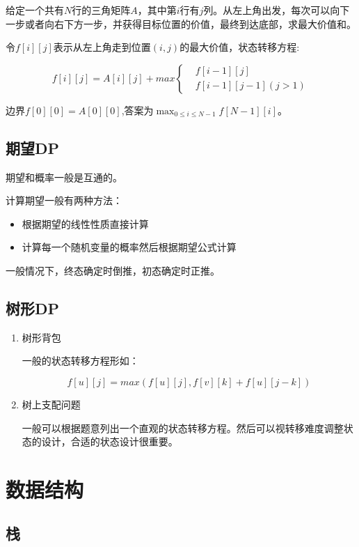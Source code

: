 \documentclass[11pt]{article}
\begin{document}
给定一个共有\(N\)行的三角矩阵\(A\)，其中第\(i\)行有\(j\)列。从左上角出发，每次可以向下一步或者向右下方一步，并获得目标位置的价值，最终到达底部，求最大价值和。

令\(f[i][j]\)表示从左上角走到位置\((i,j)\)的最大价值，状态转移方程:

\[
f[i][j]=A[i][j]+max\left\{\begin{aligned}
&f[i-1][j]\\
&f[i-1][j-1] (j>1)
\end{aligned}\right.
\]

边界\(f[0][0]=A[0][0]\),答案为\(\max_{0 \leq i \leq N-1} f[N-1][i]\)。

\subsection{期望DP}
\label{sec:orgd5b4ce2}

期望和概率一般是互通的。

计算期望一般有两种方法：

\begin{itemize}
\item 根据期望的线性性质直接计算
\item 计算每一个随机变量的概率然后根据期望公式计算
\end{itemize}

一般情况下，终态确定时倒推，初态确定时正推。

\subsection{树形DP}
\label{sec:org6eb39bc}
\begin{enumerate}
\item 树形背包
\label{sec:org039926f}

一般的状态转移方程形如：


\[
f[u][j] = max(f[u][j], f[v][k] + f[u][j - k])
\]

\item 树上支配问题
\label{sec:org6e25b53}

一般可以根据题意列出一个直观的状态转移方程。然后可以视转移难度调整状态的设计，合适的状态设计很重要。
\end{enumerate}

\section{数据结构}
\label{sec:orgcf44b6f}
\subsection{栈}
\label{sec:org2985962}
\end{document}
